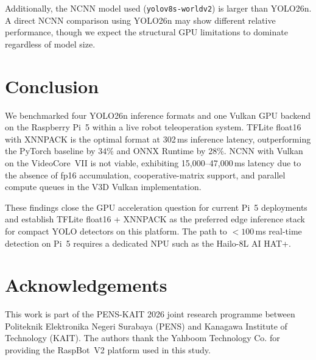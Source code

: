 \documentclass[conference]{IEEEtran}
\begin{document}
Additionally, the NCNN model used (\texttt{yolov8s-worldv2}) is larger
than YOLO26n. A direct NCNN comparison using YOLO26n may show different
relative performance, though we expect the structural GPU limitations to
dominate regardless of model size.

\section{Conclusion}

We benchmarked four YOLO26n inference formats and one Vulkan GPU backend
on the Raspberry Pi~5 within a live robot teleoperation system. TFLite
float16 with XNNPACK is the optimal format at 302\,ms inference latency,
outperforming the PyTorch baseline by 34\% and ONNX Runtime by 28\%.
NCNN with Vulkan on the VideoCore~VII is not viable, exhibiting
15,000–47,000\,ms latency due to the absence of fp16 accumulation,
cooperative-matrix support, and parallel compute queues in the V3D Vulkan
implementation.

These findings close the GPU acceleration question for current Pi~5
deployments and establish TFLite float16 + XNNPACK as the preferred edge
inference stack for compact YOLO detectors on this platform. The path
to $<100$\,ms real-time detection on Pi~5 requires a dedicated NPU
such as the Hailo-8L AI HAT+.

\section*{Acknowledgements}

This work is part of the PENS-KAIT 2026 joint research programme between
Politeknik Elektronika Negeri Surabaya (PENS) and Kanagawa Institute of Technology (KAIT).
The authors thank the Yahboom Technology Co. for providing the RaspBot~V2 platform
used in this study.



\end{document}
